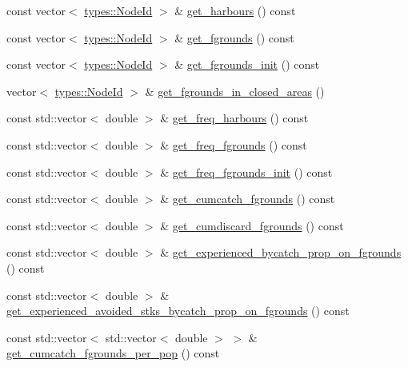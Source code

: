 \begin{DoxyCompactItemize}
\item 
const vector$<$ \mbox{\hyperlink{classtypes_1_1_node_id}{types\+::\+Node\+Id}} $>$ \& \mbox{\hyperlink{class_vessel_a592f19e6f192e04b68c58fc45fb01937}{get\+\_\+harbours}} () const
\item 
const vector$<$ \mbox{\hyperlink{classtypes_1_1_node_id}{types\+::\+Node\+Id}} $>$ \& \mbox{\hyperlink{class_vessel_a13395494b59dbc688e783047e5be4bb7}{get\+\_\+fgrounds}} () const
\item 
const vector$<$ \mbox{\hyperlink{classtypes_1_1_node_id}{types\+::\+Node\+Id}} $>$ \& \mbox{\hyperlink{class_vessel_adf36cfd1455af4248e7a1898e0738be2}{get\+\_\+fgrounds\+\_\+init}} () const
\item 
vector$<$ \mbox{\hyperlink{classtypes_1_1_node_id}{types\+::\+Node\+Id}} $>$ \& \mbox{\hyperlink{class_vessel_a1ebc237a6ef5033f490e6dd07df13563}{get\+\_\+fgrounds\+\_\+in\+\_\+closed\+\_\+areas}} ()
\item 
const std\+::vector$<$ double $>$ \& \mbox{\hyperlink{class_vessel_a51e1eda9553394c462db8c5c3e6cd53a}{get\+\_\+freq\+\_\+harbours}} () const
\item 
const std\+::vector$<$ double $>$ \& \mbox{\hyperlink{class_vessel_ad7da25eb462ba212f75289c25b4bfcc4}{get\+\_\+freq\+\_\+fgrounds}} () const
\item 
const std\+::vector$<$ double $>$ \& \mbox{\hyperlink{class_vessel_a48ccc2504eb09db5b055a463af81978a}{get\+\_\+freq\+\_\+fgrounds\+\_\+init}} () const
\item 
const std\+::vector$<$ double $>$ \& \mbox{\hyperlink{class_vessel_a13d92ab2a599d0ab15045b54090dceb7}{get\+\_\+cumcatch\+\_\+fgrounds}} () const
\item 
const std\+::vector$<$ double $>$ \& \mbox{\hyperlink{class_vessel_a8b12cff0da4148840fd0b7da6e2fe391}{get\+\_\+cumdiscard\+\_\+fgrounds}} () const
\item 
const std\+::vector$<$ double $>$ \& \mbox{\hyperlink{class_vessel_a63281d8bf564ccd5a25bbfad3e7f28c7}{get\+\_\+experienced\+\_\+bycatch\+\_\+prop\+\_\+on\+\_\+fgrounds}} () const
\item 
const std\+::vector$<$ double $>$ \& \mbox{\hyperlink{class_vessel_a4f786de4fcd50356c94a5d68df2f4dcf}{get\+\_\+experienced\+\_\+avoided\+\_\+stks\+\_\+bycatch\+\_\+prop\+\_\+on\+\_\+fgrounds}} () const
\item 
const std\+::vector$<$ std\+::vector$<$ double $>$ $>$ \& \mbox{\hyperlink{class_vessel_ac1556295e3a3aa5af5920adb6228bfe1}{get\+\_\+cumcatch\+\_\+fgrounds\+\_\+per\+\_\+pop}} () const

\end{DoxyCompactItemize}
